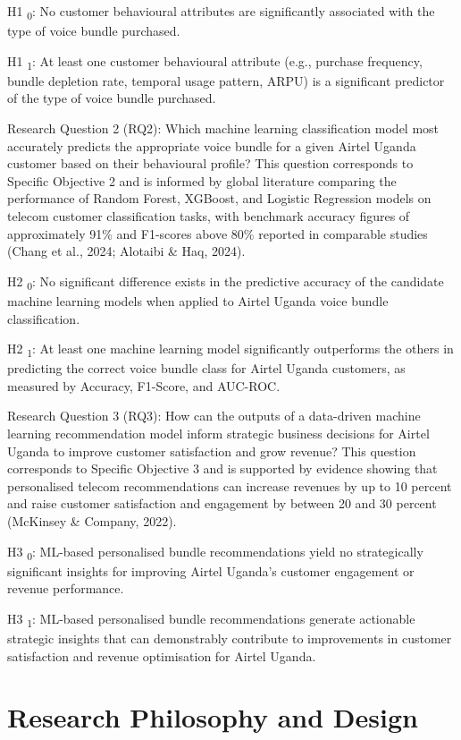 H1	\textsubscript{0}: No customer behavioural attributes are significantly associated with the type of voice bundle purchased.

H1	\textsubscript{1}: At least one customer behavioural attribute (e.g., purchase frequency, bundle depletion rate, temporal usage pattern, ARPU) is a significant predictor of the type of voice bundle purchased.

Research Question 2 (RQ2): Which machine learning classification model most accurately predicts the appropriate voice bundle for a given Airtel Uganda customer based on their behavioural profile? This question corresponds to Specific Objective 2 and is informed by global literature comparing the performance of Random Forest, XGBoost, and Logistic Regression models on telecom customer classification tasks, with benchmark accuracy figures of approximately 91\% and F1-scores above 80\% reported in comparable studies (Chang et al., 2024; Alotaibi \& Haq, 2024).

H2	\textsubscript{0}: No significant difference exists in the predictive accuracy of the candidate machine learning models when applied to Airtel Uganda voice bundle classification.

H2	\textsubscript{1}: At least one machine learning model significantly outperforms the others in predicting the correct voice bundle class for Airtel Uganda customers, as measured by Accuracy, F1-Score, and AUC-ROC.

Research Question 3 (RQ3): How can the outputs of a data-driven machine learning recommendation model inform strategic business decisions for Airtel Uganda to improve customer satisfaction and grow revenue? This question corresponds to Specific Objective 3 and is supported by evidence showing that personalised telecom recommendations can increase revenues by up to 10 percent and raise customer satisfaction and engagement by between 20 and 30 percent (McKinsey \& Company, 2022).

H3	\textsubscript{0}: ML-based personalised bundle recommendations yield no strategically significant insights for improving Airtel Uganda's customer engagement or revenue performance.

H3	\textsubscript{1}: ML-based personalised bundle recommendations generate actionable strategic insights that can demonstrably contribute to improvements in customer satisfaction and revenue optimisation for Airtel Uganda.


\section{Research Philosophy and Design}

